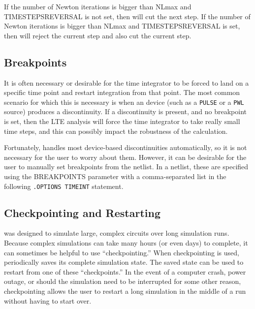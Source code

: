 
If the number of Newton iterations is bigger than NLmax and
TIMESTEPSREVERSAL is not set, then \Xyce{} will cut the next step.  If
the number of Newton iterations is bigger than NLmax and
TIMESTEPSREVERSAL is set, then \Xyce{} will reject the current step
and also cut the current step.


\subsection{Breakpoints}


It is often necessary or desirable for the time integrator to be
forced to land on a specific time point and restart integration from
that point.  The most common scenario for which this is necessary is
when an device (such as a \texttt{PULSE} or a \texttt{PWL} source)
produces a discontinuity.  If a discontinuity is present, and no
breakpoint is set, then the LTE analysis will force the time
integrator to take really small time steps, and this can possibly
impact the robustness of the calculation.

Fortunately, \Xyce{} handles most device-based discontinuities
automatically, so it is not necessary for the user to worry about
them.  However, it can be desirable for the user to manually set
breakpoints from the netlist.  In a \Xyce{} netlist, these are
specified using the BREAKPOINTS parameter with a comma-separated list
in the following \texttt{.OPTIONS TIMEINT} statement.


\subsection{Checkpointing and Restarting}
\label{Restart}
 

\Xyce{} was designed to simulate large, complex circuits over long
simulation runs.  Because complex simulations can take many hours (or
even days) to complete, it can sometimes be helpful to use
``checkpointing.''  When checkpointing is used, \Xyce{} periodically
saves its complete simulation state.  The saved state can be used to
restart \Xyce{} from one of these ``checkpoints.''  In the event of a
computer crash, power outage, or should the simulation need to be
interrupted for some other reason, checkpointing allows the user to
restart a long simulation in the middle of a run without having to
start over.

